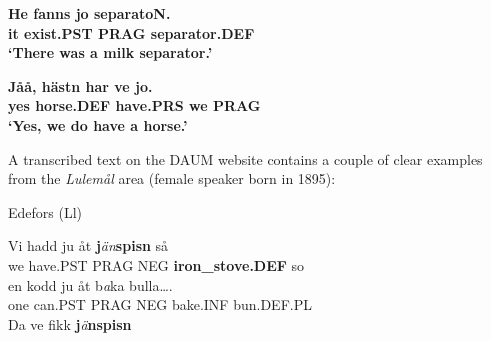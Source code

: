
 \ea\label{}\gll\bfseries
He  fanns  jo  separatoN.\\

\bfseries
it  exist.PST  PRAG  separator.DEF\\

\glt ‘There was a milk separator.’ 

\z

\item 


 \ea\label{}\gll\bfseries
Jåå,  hästn  har  ve  jo.\\

\bfseries
yes  horse.DEF  have.PRS  we  PRAG\\

\glt ‘Yes, we do have a horse.’ 

\z

A transcribed text on the DAUM website contains a couple of clear examples from the \textit{Lulemål} area (female speaker born in 1895):


\item 

Edefors (Ll)



 \ea\label{}
\gll Vi  hadd  ju  åt  \textbf{j}\textit{än}\textbf{spisn} så\\


we  have.PST  PRAG  NEG  \textbf{iron\_stove.DEF} so\\

 \ea\label{}
\gll en  kodd  ju  åt  b\textit{a}ka  bulla….\\


one  can.PST  PRAG  NEG  bake.INF  bun.DEF.PL\\

 \ea\label{}
\gll Da  ve  fikk  \textbf{j}\textit{ä}\textbf{nspisn}\\



